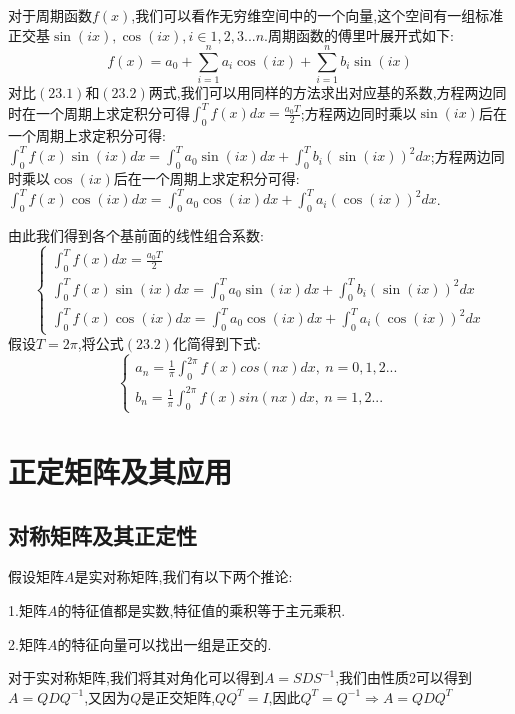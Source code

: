 \documentclass[oneside]{book}
\begin{document}
对于周期函数$f(x)$,我们可以看作无穷维空间中的一个向量,这个空间有一组标准正交基$\sin(ix),\cos(ix),i\in {1,2,3...n}$.周期函数的傅里叶展开式如下:
\begin{equation}
	f(x)=a_{0}+\sum_{i=1}^{n}a_{i}\cos(ix)+\sum_{i=1}^{n}b_{i}\sin(ix)
\end{equation}
对比$(23.1)$和$(23.2)$两式,我们可以用同样的方法求出对应基的系数,方程两边同时在一个周期上求定积分可得$\int_{0}^{T}f(x)dx=\frac{a_{0}T}{2}$;方程两边同时乘以$\sin(ix)$后在一个周期上求定积分可得:$\int_{0}^{T}f(x)\sin(ix)dx=\int_{0}^{T}a_{0}\sin(ix)dx+\int_{0}^{T}b_{i}(\sin(ix))^{2}dx$;方程两边同时乘以$\cos(ix)$后在一个周期上求定积分可得:$\int_{0}^{T}f(x)\cos(ix)dx=\int_{0}^{T}a_{0}\cos(ix)dx+\int_{0}^{T}a_{i}(\cos(ix))^{2}dx$.

由此我们得到各个基前面的线性组合系数:
\begin{equation}
	\left\{\begin{array}{c}
		\int_{0}^{T}f(x)dx=\frac{a_{0}T}{2}\\\int_{0}^{T}f(x)\sin(ix)dx=\int_{0}^{T}a_{0}\sin(ix)dx+\int_{0}^{T}b_{i}(\sin(ix))^{2}dx\\\int_{0}^{T}f(x)\cos(ix)dx=\int_{0}^{T}a_{0}\cos(ix)dx+\int_{0}^{T}a_{i}(\cos(ix))^{2}dx
	\end{array}\right.
\end{equation}
假设$T=2\pi$,将公式$(23.2)$化简得到下式:
\begin{equation}
	\left\{\begin{array}{c}
		a_{n}=\frac{1}{\pi}\int_{0}^{2\pi}f(x)cos(nx)dx,\ n=0,1,2...\\b_{n}=\frac{1}{\pi}\int_{0}^{2\pi}f(x)sin(nx)dx,\ n=1,2...
	\end{array}\right.
\end{equation}
	\part{正定矩阵及其应用}
	\chapter{对称矩阵及其正定性}
	假设矩阵$A$是实对称矩阵,我们有以下两个推论:
	
	1.矩阵$A$的特征值都是实数,特征值的乘积等于主元乘积.
	
	2.矩阵$A$的特征向量可以找出一组是正交的.
	
	对于实对称矩阵,我们将其对角化可以得到$A=SDS^{-1}$,我们由性质2可以得到$A=QDQ^{-1}$,又因为$Q$是正交矩阵,$QQ^{T}=I$,因此$Q^{T}=Q^{-1}\Rightarrow A=QDQ^{T}$
	
\end{document}
